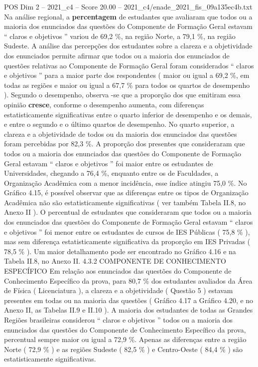 \begin{textsample}{POS Dim 2 – 2021\_c4 – Score 20.00 – 2021\_c4/enade\_2021\_fis\_09a135ec4b.txt}
Na análise regional, a \textbf{percentagem} de estudantes que avaliaram que todos ou a maioria dos enunciados das questões do Componente de Formação Geral estavam “ claros e objetivos ” variou de 69,2 \%, na região Norte, a 79,1 \%, na região Sudeste.
A análise das percepções dos estudantes sobre a clareza e a objetividade dos enunciados permite afirmar que todos ou a maioria dos enunciados de questões relativas ao Componente de Formação Geral foram considerados “ claros e objetivos ” para a maior parte dos respondentes ( maior ou igual a 69,2 \%, em todas as regiões e maior ou igual a 67,7 \% para todos os quartos de desempenho ).
Segundo o desempenho, observa -se que a proporção dos que emitiram essa opinião \textbf{cresce}, conforme o desempenho aumenta, com diferenças estatisticamente significativas entre o quarto inferior de desempenho e os demais, e entre o segundo e o último quartos de desempenho.
No quarto superior, a clareza e a objetividade de todos ou da maioria dos enunciados das questões foram percebidas por 82,3 \%.
A proporção dos presentes que consideraram que todos ou a maioria dos enunciados das questões do Componente de Formação Geral estavam “ claros e objetivos ” foi maior entre os estudantes de Universidades, chegando a 76,4 \%, enquanto entre os de Faculdades, a Organização Acadêmica com a menor incidência, esse índice atingiu 75,0 \%.
No Gráfico 4.15, é possível observar que as diferenças entre os tipos de Organização Acadêmica não são estatisticamente significativas ( ver também Tabela II.8, no Anexo II ).
O percentual de estudantes que consideraram que todos ou a maioria dos enunciados das questões do Componente de Formação Geral estavam “ claros e objetivos ” foi menor entre os estudantes de cursos de IES Públicas ( 75,8 \% ), mas sem diferença estatisticamente significativa da proporção em IES Privadas ( 78,5 \% ).
Um maior detalhamento pode ser encontrado no Gráfico 4.16 e na Tabela II.8, no Anexo II. 4.3.2 COMPONENTE DE CONHECIMENTO ESPECÍFICO Em relação aos enunciados das questões do Componente de Conhecimento Específico da prova, para 80,7 \% dos estudantes avaliados da Área de Física ( Licenciatura ), a clareza e a objetividade ( Questão 5 ) estavam presentes em todas ou na maioria das questões ( Gráfico 4.17 a Gráfico 4.20, e no Anexo II, as Tabelas II.9 e II.10 ).
A maioria dos estudantes de todas as Grandes Regiões brasileiras considerou “ claros e objetivos ” todos ou a maioria dos enunciados das questões do Componente de Conhecimento Específico da prova, percentual sempre maior ou igual a 72,9 \%.
Apenas as diferenças entre a região Norte ( 72,9 \% ) e as regiões Sudeste ( 82,5 \% ) e Centro-Oeste ( 84,4 \% ) são estatisticamente significativas.

\end{textsample}
